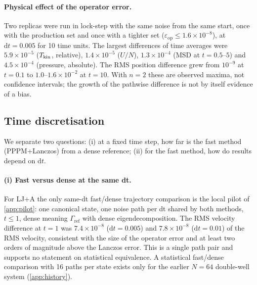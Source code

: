 \documentclass[11pt]{article}
\DeclareRobustCommand{\_}{\textunderscore\allowbreak}
\theoremstyle{remark}
\theoremstyle{definition}
\newcommand{\Gref}{\Gamma_{\mathrm{ref}}}
\newcommand{\eop}{\varepsilon_{\mathrm{op}}}
\begin{document}
\paragraph{Physical effect of the operator error.}
Two replicas were run in lock-step with the same noise from the same start, once with the production set and once with
a tighter set ($\eop\le1.6\times10^{-8}$), at $\mathrm dt=0.005$ for 10 time units. The largest differences of time
averages were $5.9\times10^{-5}$ ($T_{\rm kin}$, relative), $1.4\times10^{-5}$ ($U/N$), $1.3\times10^{-4}$ (MSD at
$t=0.5$--$5$) and $4.5\times10^{-4}$ (pressure, absolute). The RMS position difference grew from $10^{-9}$ at $t=0.1$
to $1.0$--$1.6\times10^{-2}$ at $t=10$. With $n=2$ these are observed maxima, not confidence intervals; the growth of the
pathwise difference is not by itself evidence of a bias.

\subsection{Time discretisation}\label{sec:numerics_time}

We separate two questions: (i) at a fixed time step, how far is the fast method (PPPM+Lanczos) from a dense reference;
(ii) for the fast method, how do results depend on $\mathrm dt$.

\paragraph{(i) Fast versus dense at the same dt.}
For LJ+A the only same-dt fast/dense trajectory comparison is the local pilot of \cref{app:pilot}: one canonical state,
one noise path per dt shared by both methods, $t\le1$, dense meaning $\Gref$ with dense eigendecomposition. The RMS velocity
difference at $t=1$ was $7.4\times10^{-8}$ ($\mathrm dt=0.005$) and $7.8\times10^{-8}$ ($\mathrm dt=0.01$) of the RMS velocity,
consistent with the size of the operator error and at least two orders of magnitude above the Lanczos error. This is
a single path pair and supports no statement on statistical equivalence. A statistical fast/dense comparison with
16 paths per state exists only for the earlier $N=64$ double-well system (\cref{app:history}).
\end{document}
